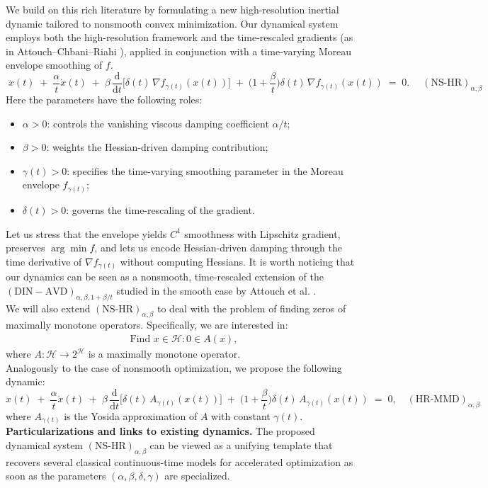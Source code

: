 \documentclass[11pt]{article}
\numberwithin{equation}{section}
\begin{document}
We build on this rich literature by formulating a new high-resolution inertial dynamic tailored to {nonsmooth} convex minimization. Our dynamical system employs both the high-resolution framework \cite{AttouchFadili2022} and the {time-rescaled gradients} (as in Attouch–Chbani–Riahi \cite{AttouchRiahi2019}), applied in conjunction with a time-varying Moreau envelope smoothing of $f$.
\begin{equation}
\boxed{\;
\ddot x(t)\;+\;\frac{\alpha}{t}\dot x(t)\;+\;\beta\,\frac{\mathrm{d}}{\mathrm{d}t}\!\Big[\delta(t)\,\nabla f_{\gamma(t)}(x(t))\Big]
\;+\;\Big(1+\frac{\beta}{t}\Big)\delta(t)\,\nabla f_{\gamma(t)}(x(t))\;=\;0.
\;}
\quad (\text{NS-HR})_{\alpha,\beta}
\end{equation}
Here the parameters have the following roles:
\begin{itemize}
    \item \( \alpha>0 \): controls the {vanishing viscous damping} coefficient \( \alpha/t \);
    \item \( \beta>0 \): weights the { Hessian-driven damping} contribution;
    \item \( \gamma(t)>0 \): specifies the {time-varying smoothing parameter} in the Moreau envelope \( f_{\gamma(t)} \);
    \item \( \delta(t)>0 \): governs the {time-rescaling of the gradient}.
\end{itemize} 
Let us stress that the envelope yields \(C^1\) smoothness with Lipschitz gradient, preserves \(\arg\min f\), and lets us encode {Hessian-driven damping} through the time derivative of \(\nabla f_{\gamma(t)}\) without computing Hessians.
It is worth noticing that our dynamics can be seen as a nonsmooth, time-rescaled extension of the $\mathrm{(DIN\!-\!AVD)}_{\alpha,\beta,1+\beta/t}$ studied in the smooth case by Attouch et al. \cite{AttouchChbani2022}.\\[2mm]
We will also extend $(\text{NS-HR})_{\alpha,\beta}$ to deal with the problem of finding zeros of maximally monotone operators. Specifically, we are interested in: 
\begin{align*}
    \text{Find } x \in \mathcal{H}: 0 \in A(x),
\end{align*}
where $A:\mathcal{H}\to 2^{\mathbf{\mathcal{H}}}$ is a maximally monotone operator. \\
Analogously to the case of nonsmooth optimization, we propose the following dynamic:  
\begin{equation*}
\boxed{\ddot x(t)\;+\;\frac{\alpha}{t}\dot x(t)\;+\;\beta\,\frac{\mathrm{d}}{\mathrm{d}t}\!\Big[\delta(t)\,A_{\gamma(t)}(x(t))\Big]
\;+\;\Big(1+\frac{\beta}{t}\Big)\delta(t)\,A_{\gamma(t)}(x(t))\;=\;0,} \quad (\text{HR-MMD})_{\alpha,\beta}
\end{equation*}
where $A_{\gamma(t)}$ is the Yosida approximation of $A$ with constant $\gamma(t)$. \\[3mm]
\textbf{Particularizations and links to existing dynamics.}
The proposed dynamical system $(\mathrm{NS\text{-}HR})_{\alpha,\beta}$ can be viewed as a unifying template that
recovers several classical continuous-time models for accelerated optimization as soon as the parameters
$(\alpha,\beta,\delta,\gamma)$ are specialized.
\end{document}
